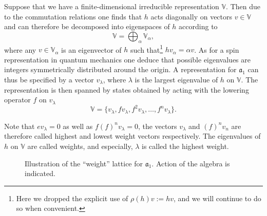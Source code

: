 Suppose that we have a finite-dimensional irreducible representation $\mathbb{V}$. Then due to the commutation relations one finds that $h$ acts diagonally on vectors $v\in \mathbb{V}$ and can therefore be decomposed into eigenspaces of $h$ according to
\begin{equation}
    \mathbb{V} = \bigoplus_\alpha \mathbb{V}_\alpha,
\end{equation}
where any $v\in\mathbb{V}_\alpha$ is an eigenvector of $h$ such that\footnote{Here we dropped the explicit use of $\rho(h)v :=hv$, and we will continue to do so when convenient.} $hv_\alpha = \alpha v$. As for a spin representation in quantum mechanics one deduce that possible eigenvalues are integers symmetrically distributed around the origin. A representation for $\mathfrak{a}_1$ can thus be specified by a vector $v_\lambda$, where $\lambda$ is the largest eigenvalue of $h$ on $\mathbb{V}$. The representation is then spanned by states obtained by acting with the lowering operator $f$ on $v_\lambda$ 
\begin{equation}
    \mathbb{V} = \{v_\lambda,fv_\lambda,f^2v_\lambda,\ldots,f^{n}v_\lambda\}.
\end{equation}

Note that $ev_\lambda = 0$ as well as $f(f)^{n}v_\lambda=0$, the vectors $v_\lambda$ and $(f)^{n}v_n$ are therefore called highest and lowest weight vectors respectively. The eigenvalues of $h$ on $\mathbb{V}$ are called weights, and especially, $\lambda$ is called the highest weight. 

\begin{figure}
    \centering
    \caption{Illustration of the ``weight'' lattice for $\mathfrak{a}_1$. Action of the algebra is indicated. }
    \label{fig:SlTwoRep}
\end{figure}



